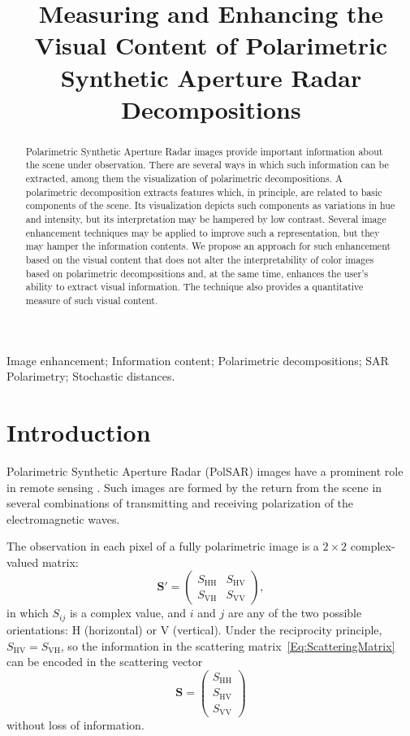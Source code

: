 \documentclass{article}
\title{Measuring and Enhancing the Visual Content of Polarimetric Synthetic Aperture Radar Decompositions}
\begin{document}
%
\maketitle
%
\begin{abstract}
Polarimetric Synthetic Aperture Radar images provide important information about the scene under observation.
There are several ways in which such information can be extracted, among them the visualization of polarimetric decompositions.
A polarimetric decomposition extracts features which, in principle, are related to basic components of the scene.
Its visualization depicts such components as variations in hue and intensity, but its interpretation may be hampered by low contrast.
Several image enhancement techniques may be applied to improve such a representation, but they may hamper the information contents.
We propose an approach for such enhancement based on the visual content that does not alter the interpretability of color images based on polarimetric decompositions and, at the same time, enhances the user's ability to extract visual information.
The technique also provides a quantitative measure of such visual content.
\end{abstract}
%
\begin{keywords}
Image enhancement;
Information content;
Polarimetric decompositions;
SAR Polarimetry;
Stochastic distances.
\end{keywords}
%
\section{Introduction}
\label{sec:intro}

Polarimetric Synthetic Aperture Radar (PolSAR) images have a prominent role in remote sensing \citep{PolarisationApplicationsRemoteSensing,LeePottier2009PolarimetricRadarImaging}.
Such images are formed by the return from the scene in several combinations of transmitting and receiving polarization of the electromagnetic waves.

The observation in each pixel of a fully polarimetric image is a $2\times2$ complex-valued matrix:
\begin{equation}
\bm S' = \begin{pmatrix}
   	S_{\text{HH}} & S_{\text{HV}}\\
   	S_{\text{VH}} & S_{\text{VV}}
\end{pmatrix}, \label{Eq:ScatteringMatrix}
\end{equation}
in which $S_{ij}$ is a complex value, and $i$ and $j$ are any of the two possible orientations: $\text{H}$ (horizontal) or $\text{V}$ (vertical).
Under the reciprocity principle, $S_{\text{HV}}=S_{\text{VH}}$, so the information in the scattering matrix~\eqref{Eq:ScatteringMatrix} can be encoded in the scattering vector
\begin{equation}
\bm S = \begin{pmatrix}
   	S_{\text{HH}}\\
   	S_{\text{HV}}\\
   	S_{\text{VV}}
\end{pmatrix}
\end{equation}
without loss of information.
\end{document}
